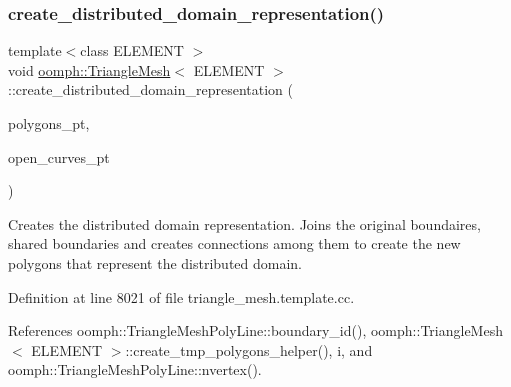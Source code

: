 \subsubsection{\texorpdfstring{create\+\_\+distributed\+\_\+domain\+\_\+representation()}{create\_distributed\_domain\_representation()}}
{\footnotesize\ttfamily template$<$class E\+L\+E\+M\+E\+NT $>$ \\
void \hyperlink{classoomph_1_1TriangleMesh}{oomph\+::\+Triangle\+Mesh}$<$ E\+L\+E\+M\+E\+NT $>$\+::create\+\_\+distributed\+\_\+domain\+\_\+representation (\begin{DoxyParamCaption}\item[{\hyperlink{classoomph_1_1Vector}{Vector}$<$ \hyperlink{classoomph_1_1TriangleMeshPolygon}{Triangle\+Mesh\+Polygon} $\ast$$>$ \&}]{polygons\+\_\+pt,  }\item[{\hyperlink{classoomph_1_1Vector}{Vector}$<$ \hyperlink{classoomph_1_1TriangleMeshOpenCurve}{Triangle\+Mesh\+Open\+Curve} $\ast$$>$ \&}]{open\+\_\+curves\+\_\+pt }\end{DoxyParamCaption})\hspace{0.3cm}{\ttfamily [protected]}}



Creates the distributed domain representation. Joins the original boundaires, shared boundaries and creates connections among them to create the new polygons that represent the distributed domain. 



Definition at line 8021 of file triangle\+\_\+mesh.\+template.\+cc.



References oomph\+::\+Triangle\+Mesh\+Poly\+Line\+::boundary\+\_\+id(), oomph\+::\+Triangle\+Mesh$<$ E\+L\+E\+M\+E\+N\+T $>$\+::create\+\_\+tmp\+\_\+polygons\+\_\+helper(), i, and oomph\+::\+Triangle\+Mesh\+Poly\+Line\+::nvertex().

\mbox{\label{classoomph_1_1TriangleMesh_a1589b532530c3a8ddfb88f93b2e832ea}} 
